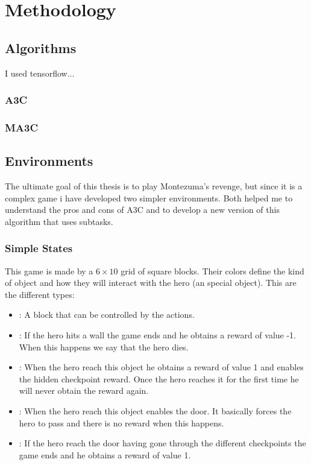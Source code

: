 \newcommand{\refscreen}[1]{\hyperref[fig:montezuma-map]{screen~#1}}
\chapter{Methodology}

\section{Algorithms}
I used tensorflow...

\subsection{\acl{A3C}}

\subsection{\acl{MA3C}\label{subsec:MA3C}}

\section{Environments}
The ultimate goal of this thesis is to play Montezuma's revenge, but since it is a complex game i have developed two
simpler environments.
Both helped me to understand the pros and cons of \ac{A3C} and to develop a new version of this algorithm that uses subtasks.

\subsection{Simple States}

This game is made by a $6 \times 10$ grid of square blocks.
Their colors define the kind of object and how they will interact with the hero (an special object).
This are the different types:
\begin{itemize}
  \item {}: A block that can be controlled by the actions.
  \item {}: If the hero hits a wall the game ends and he obtains a reward of value -1.
  When this happens we say that the hero dies.
  \item {}: When the hero reach this object he obtains a reward of value 1 and enables the hidden
  checkpoint reward.
  Once the hero reaches it for the first time he will never obtain the reward again.
  \item {}: When the hero reach this object enables the door.
  It basically forces the hero to pass and there is no reward when this happens.
  \item {}: If the hero reach the door having gone through the different checkpoints the game ends and
  he obtains a reward of value 1.
\end{itemize}

